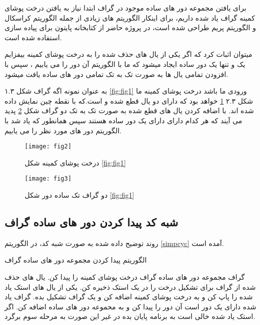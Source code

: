 برای یافتن مجموعه دور های ساده موجود در گراف ابتدا نیاز به یافتن درخت پوشای کمینه
گراف یاد شده داریم، برای اینکار الگوریتم های زیادی از جمله الگوریتم کراسکال و
الگوریتم پریم
طراحی شده است، در پروژه حاضر از کتابخانه
پایتون برای پیاده سازی استفاده شده است.

میتوان اثبات کرد که اگر یکی از یال های حذف شده را به درخت پوشای کمینه بیفزایم 
یک و تنها یک دور ساده ایجاد میشود که ما با الگوریتم
آن دور را می یابیم
، سپس با افزودن تمامی یال ها به صورت تک به تک تمامی دور های ساده یافت میشود.

به عنوان نمونه اگه گراف شکل ۱.۳
\ref{fig:fig1}
ورودی ما باشد درخت پوشای کمینه ما شکل ۲.۳
\ref{fig:fig2}
خواهد بود که دارای دو یال قطع شده
و
است.که با نقطه چین نمایش داده شده اند.
با اضافه کردن یال های قطع شده به صورت تک به تک دو گراف شکل
\ref{fig:fig3}
پدید می آیند که هر کدام دارای دارای یک دور ساده هستند سپس همانطور که یاد شد
با الگوریتم
دور های مورد نظر را می یابیم.
\begin{figure}[ht]
	\centerline{\texttt{[image: fig2]}}
	\caption{درخت پوشای کمینه شکل
	\ref{fig:fig1} }
	\label{fig:fig2}
\end{figure}

\begin{figure}[ht]
	\centerline{\texttt{[image: fig3]}}
	\caption{دو گراف تک ساده دور شکل
		\ref{fig:fig1} }
	\label{fig:fig3}
\end{figure}


\subsection{شبه کد پیدا کردن دور های ساده گراف}
روند توضیح داده شده به صورت شبه کد، در الگوریتم 
 \eqref{simpcyc}
آمده است.
\begin{algorithm}[ht]
	\onehalfspacing
	\caption{الگوریتم پیدا کردن مجموعه دور های ساده گراف} 
	\label{simpcyc}
	\begin{algorithmic}[1]
		\REQUIRE
		 گراف
		\ENSURE
		 مجموعه دور های ساده گراف
		\STATE 
		درخت پوشای کمینه را پیدا کن.
		\STATE 
		یال های حذف شده از گراف برای تشکیل درخت را در یک استک ذخیره کن.
		\STATE
		یکی از یال های استک یاد شده را پاپ کن و به درخت پوشای کمینه اضافه کن و یک گراف تشکیل بده.
		\STATE
		گراف یاد شده دارای یک دور است آن دور را پیدا کن و به محموعه دور های ساده اضافه کن.
		\STATE
		اگر استک یاد شده خالی است به برنامه پایان بده در غیر این صورت به مرحله سوم برگرد.
	\end{algorithmic}
\end{algorithm}
